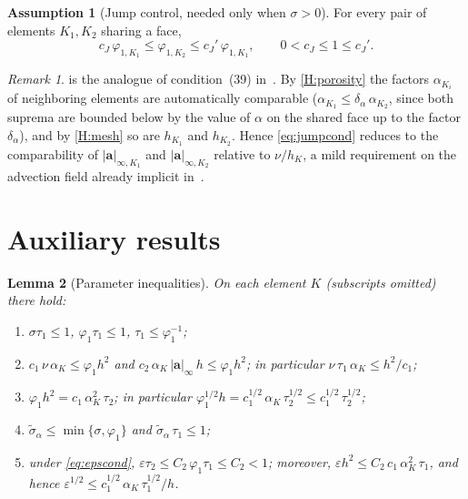 \documentclass[11pt,a4paper]{article}
\newcommand{\ba}{\boldsymbol{a}}
\newcommand{\sigmatilde}{\widetilde{\sigma}_{\alpha}}
\theoremstyle{plain}
\newtheorem{lemma}{Lemma}[section]
\theoremstyle{remark}
\newtheorem{remark}[lemma]{Remark}
\theoremstyle{definition}
\newtheorem{assumption}{Assumption}
\numberwithin{equation}{section}
\begin{document}
\begin{assumption}[Jump control, needed only when $\sigma>0$]\label{H:jump}
For every pair of elements $K_1,K_2$ sharing a face,
\begin{equation}\label{eq:jumpcond}
  c_J\,\varphi_{1,K_1}\le \varphi_{1,K_2}\le c_J'\,\varphi_{1,K_1},
  \qquad 0<c_J\le 1\le c_J' .
\end{equation}
\end{assumption}

\begin{remark}\label{rem:jump}
 is the analogue of condition~(39) in~\cite{codina2001}. By \cref{H:porosity}
the factors $\alpha_{K_i}$ of neighboring elements are automatically comparable
($\alpha_{K_1}\le\delta_\alpha\,\alpha_{K_2}$, since both suprema are bounded below by the
value of $\alpha$ on the shared face up to the factor $\delta_\alpha$), and by
\cref{H:mesh} so are $h_{K_1}$ and $h_{K_2}$. Hence \eqref{eq:jumpcond} reduces to the
comparability of $|\ba|_{\infty,K_1}$ and $|\ba|_{\infty,K_2}$ relative to $\nu/h_K$, a
mild requirement on the advection field already implicit in~\cite{codina2001}.
\end{remark}

\section{Auxiliary results}\label{sec:auxiliary}

\begin{lemma}[Parameter inequalities]\label{lem:parameters}
On each element $K$ (subscripts omitted) there hold:
\begin{enumerate}[label=\textup{(P\arabic*)},leftmargin=3.2em]
  \item\label{P:basic}
  $\sigma\tau_1\le 1$, $\varphi_1\tau_1\le 1$, $\tau_1\le \varphi_1^{-1}$;
  \item\label{P:components}
  $c_1\,\nu\,\alpha_K\le \varphi_1 h^2$ and
  $c_2\,\alpha_K\,|\ba|_{\infty}\,h\le \varphi_1 h^2$; in particular
  $\nu\,\tau_1\,\alpha_K\le h^2/c_1$;
  \item\label{P:27}
  $\varphi_1 h^2 = c_1\,\alpha_K^2\,\tau_2$; in particular
  $\varphi_1^{1/2} h = c_1^{1/2}\,\alpha_K\,\tau_2^{1/2}
  \le c_1^{1/2}\,\tau_2^{1/2}$;
  \item\label{P:sigmatilde}
  $\sigmatilde\le\min\{\sigma,\varphi_1\}$ and
  $\sigmatilde\,\tau_1\le 1$;
  \item\label{P:eps}
  under \eqref{eq:epscond}, $\varepsilon\tau_2\le C_2\,\varphi_1\tau_1\le C_2<1$;
  moreover, $\varepsilon h^2\le C_2\,c_1\,\alpha_K^2\,\tau_1$, and hence
  $\varepsilon^{1/2}\le c_1^{1/2}\,\alpha_K\,\tau_1^{1/2}/h$.
\end{enumerate}
\end{lemma}
\end{document}
